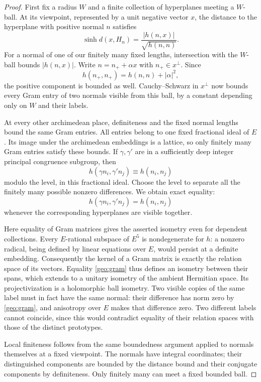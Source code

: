 \documentclass[11pt,reqno]{amsart}
\numberwithin{equation}{section}
\theoremstyle{definition}
\theoremstyle{remark}
\begin{document}
\begin{proof}
First fix a radius $W$ and a finite collection of hyperplanes meeting a
$W$-ball.  At its viewpoint, represented by a unit negative
vector $x$, the distance to the hyperplane with positive normal $n$
satisfies
\[
  \sinh d(x,H_n)=\frac{|h(n,x)|}{\sqrt{h(n,n)}}.
\]
For a normal of one of our finitely many fixed lengths, intersection
with the $W$-ball bounds $|h(n,x)|$.  Write $n=n_++\alpha x$ with
$n_+\in x^\perp$.  Since
\[
 h(n_+,n_+)=h(n,n)+|\alpha|^2,
\]
the positive component is bounded as well.  Cauchy--Schwarz in
$x^\perp$ now bounds every Gram entry of two normals visible from this
ball, by a constant depending only on $W$ and their labels.

At every other archimedean place, definiteness and the fixed normal
lengths bound the same Gram entries.  All entries belong to one fixed
fractional ideal of $E$.  Its image under the archimedean embeddings
is a lattice, so only finitely many Gram entries satisfy these bounds.
If $\gamma,\gamma'$ are in a sufficiently deep integer principal
congruence subgroup, then
\[
 h(\gamma n_i,\gamma'n_j)\equiv h(n_i,n_j)
\]
modulo the level, in this fractional ideal.  Choose the level to
separate all the finitely many possible nonzero differences.  We obtain
exact equality:
\begin{equation}\label{geo:gram}
            h(\gamma n_i,\gamma'n_j)=h(n_i,n_j)
\end{equation}
whenever the corresponding hyperplanes are visible together.

Here equality of Gram matrices gives the asserted isometry even for
dependent collections.  Every $E$-rational subspace of $E^5$ is
nondegenerate for $h$: a nonzero radical, being defined by linear
equations over $E$, would persist at a definite embedding.  Consequently
the kernel of a Gram matrix is exactly the relation space of its
vectors.  Equality \eqref{geo:gram} thus defines an isometry between
their spans, which extends to a unitary isometry of the ambient
Hermitian space.  Its projectivization is a holomorphic ball isometry.
Two visible copies of the same label must in fact have the same normal:
their difference has norm zero by \eqref{geo:gram}, and anisotropy over
$E$ makes that difference zero.  Two different labels cannot coincide,
since this would contradict equality of their relation spaces with
those of the distinct prototypes.

Local finiteness follows from the same boundedness argument applied to
normals themselves at a fixed viewpoint.  The normals have integral
coordinates; their distinguished components are bounded by the distance
bound and their conjugate components by definiteness.  Only finitely
many can meet a fixed bounded ball.


\end{proof}
\end{document}
